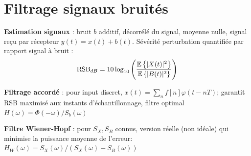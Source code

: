 
\section{Filtrage signaux bruités}

\textbf{Estimation signaux} : bruit $b$ additif, décorrélé du signal, moyenne nulle, signal reçu par récepteur $y(t) = x(t) + b(t)$. Sévérité perturbation quantifiée par rapport signal à bruit :
\begin{equation*}
    \text{RSB}_{dB} = 10\log_{10}\left(\frac{\mathbb{E}\left\{|X(t)|^2\right\}}{\mathbb{E}\left\{|B(t)|^2\right\}}\right)
\end{equation*}

\textbf{Filtrage accordé} : pour input discret, $x(t)=\sum_nf[n]\varphi(t-nT)$; garantit RSB maximisé aux instants d'échantillonnage, filtre optimal $H(\omega) = \Phi(-\omega)/S_b(\omega)$

\textbf{Filtre Wiener-Hopf} : pour $S_X, S_B$ connus, version réelle (non idéale) qui minimise la puissance moyenne de l'erreur: $H_W(\omega) = S_X(\omega)/(S_X(\omega)+S_B(\omega))$

